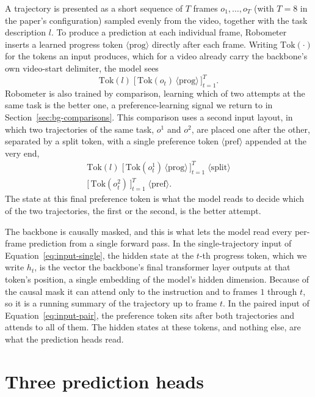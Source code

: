 A trajectory is presented as a short sequence of $T$ frames $o_1, \dots, o_T$ (with $T = 8$ in the paper's configuration) sampled evenly from the video, together with the task description $l$. To produce a prediction at each individual frame, Robometer inserts a learned progress token $\langle\mathrm{prog}\rangle$ directly after each frame. Writing $\mathrm{Tok}(\cdot)$ for the tokens an input produces, which for a video already carry the backbone's own video-start delimiter, the model sees
\begin{equation}
\mathrm{Tok}(l)\;\big[\,\mathrm{Tok}(o_t)\,\langle\mathrm{prog}\rangle\,\big]_{t=1}^{T} .
\label{eq:input-single}
\end{equation}
Robometer is also trained by comparison, learning which of two attempts at the same task is the better one, a preference-learning signal we return to in Section~\ref{sec:bg-comparisons}. This comparison uses a second input layout, in which two trajectories of the same task, $o^1$ and $o^2$, are placed one after the other, separated by a split token, with a single preference token $\langle\mathrm{pref}\rangle$ appended at the very end,
\begin{multline}
\mathrm{Tok}(l)\;\big[\,\mathrm{Tok}(o^1_t)\,\langle\mathrm{prog}\rangle\,\big]_{t=1}^{T}\;\langle\mathrm{split}\rangle\\
\big[\,\mathrm{Tok}(o^2_t)\,\big]_{t=1}^{T}\;\langle\mathrm{pref}\rangle .
\label{eq:input-pair}
\end{multline}
The state at this final preference token is what the model reads to decide which of the two trajectories, the first or the second, is the better attempt.

The backbone is causally masked, and this is what lets the model read every per-frame prediction from a single forward pass. In the single-trajectory input of Equation~\ref{eq:input-single}, the hidden state at the $t$-th progress token, which we write $h_t$, is the vector the backbone's final transformer layer outputs at that token's position, a single embedding of the model's hidden dimension. Because of the causal mask it can attend only to the instruction and to frames $1$ through $t$, so it is a running summary of the trajectory up to frame $t$. In the paired input of Equation~\ref{eq:input-pair}, the preference token sits after both trajectories and attends to all of them. The hidden states at these tokens, and nothing else, are what the prediction heads read.

\section{Three prediction heads}

